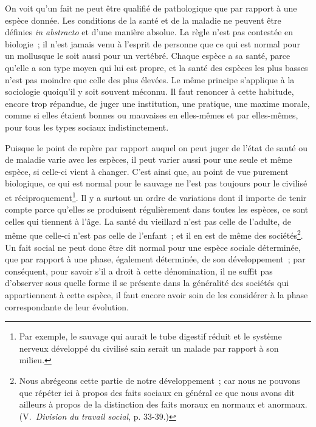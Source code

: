 \documentclass[french,twoside]{book} %
\begin{document}
On voit qu’un fait ne peut être qualifié de pathologique que par rapport à une espèce donnée. Les conditions de la santé et de la maladie ne peuvent être définies {\itshape in abstracto} et d’une manière absolue. La règle n’est pas contestée en biologie ; il n’est jamais venu à l’esprit de personne que ce qui est normal pour un mollusque le soit aussi pour un vertébré. Chaque espèce a sa santé, parce qu’elle a son type moyen qui lui est propre, et la santé des espèces les plus basses n’est pas moindre que celle des plus élevées. Le même principe s’applique à la sociologie quoiqu’il y soit souvent méconnu. Il faut renoncer à cette habitude, encore trop répandue, de juger une institution, une pratique, une maxime morale, comme si elles étaient bonnes ou mauvaises en elles-mêmes et par elles-mêmes, pour tous les types sociaux indistinctement.\par
Puisque le point de repère par rapport auquel on peut juger de l’état de santé ou de maladie varie avec les espèces, il peut varier aussi pour une seule et même espèce, si celle-ci vient à changer. C’est ainsi que, au point de vue purement biologique, ce qui est normal pour le sauvage ne l’est pas toujours pour le civilisé et réciproquement\footnote{ Par exemple, le sauvage qui aurait le tube digestif réduit et le système nerveux développé du civilisé sain serait un malade par rapport à son milieu.}. Il y a surtout un ordre de variations dont il importe de tenir compte parce qu’elles se produisent régulièrement dans toutes les espèces, ce sont celles qui tiennent à l’âge. La santé du vieillard n’est pas celle de l’adulte, de même que celle-ci n’est pas celle de l’enfant ; et il en est de même des sociétés\footnote{ Nous abrégeons cette partie de notre développement ; car nous ne pouvons que répéter ici à propos des faits sociaux en général ce que nous avons dit ailleurs à propos de la distinction des faits moraux en normaux et anormaux.(V. \emph{Division du travail social}, p. 33-39.)}. Un fait social ne peut donc être dit normal pour une espèce sociale déterminée, que par rapport à une phase, également déterminée, de son développement ; par conséquent, pour savoir s’il a droit à cette dénomination, il ne suffit pas d’observer sous quelle forme il se présente dans la généralité des sociétés qui appartiennent à cette espèce, il faut encore avoir soin de les considérer à la phase correspondante de leur évolution.\par
\end{document}
